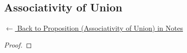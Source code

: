 
\subsection*{Associativity of Union}
\label{prf:assoc-union}

\begin{remark*}[Return]
\hyperref[prop:assoc-union]{$\leftarrow$ Back to Proposition (Associativity of Union) in Notes}
\end{remark*}

\begin{proof}
\end{proof}

\begin{remark*}

\end{remark*}

\begin{remark*}[Dependencies]

\FlashUses{}
\end{remark*}
